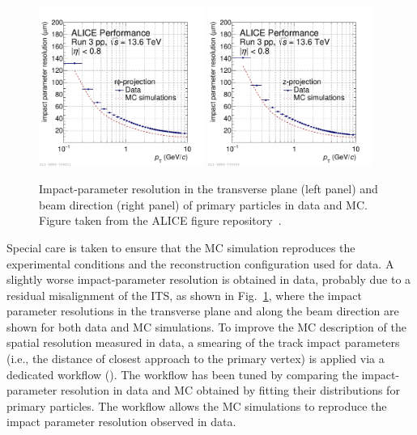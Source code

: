 \begin{figure}[tb]
    \begin{center}
    \includegraphics[width=0.48\textwidth]{Figures/Chapter 6/sigmadcaxy_lhc22o_pass4_qm.pdf}
    \includegraphics[width=0.48\textwidth]{Figures/Chapter 6/sigmadcaz_lhc22q_pass2_lhcc.pdf}
    \caption{Impact-parameter resolution in the transverse plane (left panel) and beam direction (right panel) of primary particles in data and MC. Figure taken from the ALICE figure repository~\cite{ALICE_figures}.} 
    \label{fig:dca_res} 
    \end{center}
\end{figure}

Special care is taken to ensure that the MC simulation reproduces the experimental conditions and the reconstruction configuration used for data. A slightly worse impact-parameter resolution is obtained in data, probably due to a residual misalignment of the ITS, as shown in Fig.~\ref{fig:dca_res}, where the impact parameter resolutions in the transverse plane and along the beam direction are shown for both data and MC simulations. To improve the MC description of the spatial resolution measured in data, a smearing of the track impact parameters (i.e., the distance of closest approach to the primary vertex) is applied via a dedicated workflow (). The workflow has been tuned by comparing the impact-parameter resolution in data and MC obtained by fitting their distributions for primary particles. The  workflow allows the MC simulations to reproduce the impact parameter resolution observed in data.

